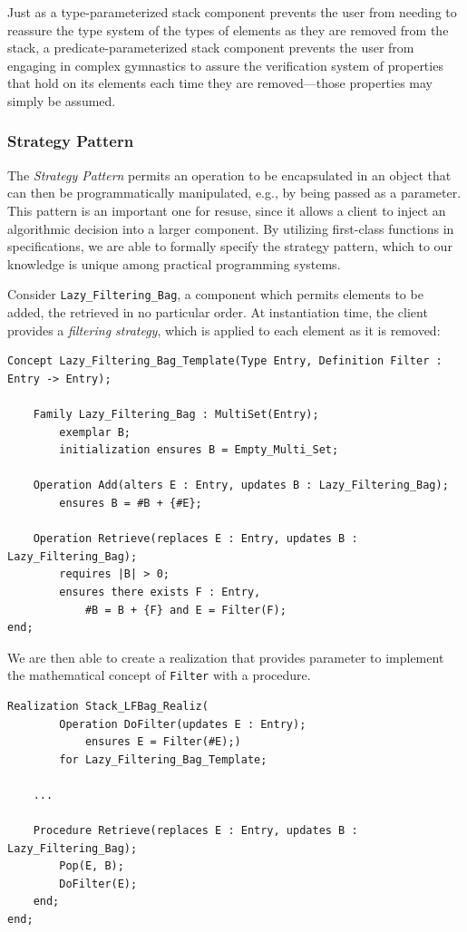 Just as a type-parameterized stack component prevents the user from needing to reassure the type system of the types of elements as they are removed from the stack, a predicate-parameterized stack component prevents the user from engaging in complex gymnastics to assure the verification system of properties that hold on its elements each time they are removed---those properties may simply be assumed. 

		\subsubsection{Strategy Pattern\label{strategyPattern}}

The \emph{Strategy Pattern} permits an operation to be encapsulated in an object that can then be programmatically manipulated, e.g., by being passed as a parameter.  This pattern is an important one for resuse, since it allows a client to inject an algorithmic decision into a larger component.  By utilizing first-class functions in specifications, we are able to formally specify the strategy pattern, which to our knowledge is unique among practical programming systems.

Consider \texttt{Lazy\_Filtering\_Bag}, a component which permits elements to be added, the retrieved in no particular order.   At instantiation time, the client provides a \emph{filtering strategy}, which is applied to each element as it is removed:

\begin{lstlisting}
Concept Lazy_Filtering_Bag_Template(Type Entry, Definition Filter : Entry -> Entry);
	
	Family Lazy_Filtering_Bag : MultiSet(Entry);
		exemplar B;
		initialization ensures B = Empty_Multi_Set;

	Operation Add(alters E : Entry, updates B : Lazy_Filtering_Bag);
		ensures B = #B + {#E};

	Operation Retrieve(replaces E : Entry, updates B : Lazy_Filtering_Bag);
		requires |B| > 0;
		ensures there exists F : Entry,
			#B = B + {F} and E = Filter(F);
end;
\end{lstlisting}

We are then able to create a realization that provides parameter to implement the mathematical concept of \texttt{Filter} with a procedure.

\begin{lstlisting}
Realization Stack_LFBag_Realiz(
		Operation DoFilter(updates E : Entry);
			ensures E = Filter(#E);)
		for Lazy_Filtering_Bag_Template;

	...

	Procedure Retrieve(replaces E : Entry, updates B : Lazy_Filtering_Bag);
		Pop(E, B);
		DoFilter(E);
	end;
end;
\end{lstlisting}

